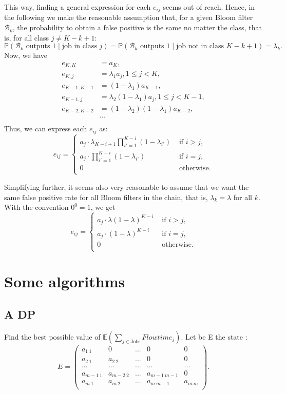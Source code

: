 \documentclass{article}
\begin{document}
This way, finding a general expression for each \(e_{ij}\) seems out of reach.
Hence, in the following we make the reasonable assumption that, for a given Bloom filter \(\mathcal{B}_k\), the probability to obtain a false positive is the same no matter the class, that is, for all class \(j\ne K-k+1\):
\[
    \mathbb{P}(\mathcal{B}_k\text{ outputs 1}\mid\text{job in class }j)=
    \mathbb{P}(\mathcal{B}_k\text{ outputs 1}\mid\text{job not in class }K-k+1)=
    \lambda_k.
\]
Now, we have
\begin{align*}
    e_{K,K}&=a_K, \\
    e_{K,j}&=\lambda_1a_j,1\le j<K, \\
    e_{K-1,K-1}&=(1-\lambda_1)a_{K-1}, \\
    e_{K-1,j}&=\lambda_2(1-\lambda_1)a_j,1\le j<K-1, \\
    e_{K-2,K-2}&=(1-\lambda_2)(1-\lambda_1)a_{K-2}, \\
    &\cdots \\
\end{align*}
Thus, we can express each \(e_{ij}\) as:
\[
    e_{ij}=\begin{cases}
        a_j\cdot\lambda_{K-i+1}\prod_{i'=1}^{K-i} (1-\lambda_{i'}) & \text{ if }i>j, \\
        a_j\cdot\prod_{i'=1}^{K-i} (1-\lambda_{i'}) & \text{ if }i=j, \\
        0 & \text{ otherwise.} \\
    \end{cases}
\]

Simplifying further, it seems also very reasonable to assume that we want the same false positive rate for all Bloom filters in the chain, that is, \(\lambda_k=\lambda\) for all \(k\).
With the convention \(0^0=1\), we get
\[
    e_{ij}=\begin{cases}
        a_j\cdot\lambda(1-\lambda)^{K-i} & \text{ if }i>j, \\
        a_j\cdot(1-\lambda)^{K-i} & \text{ if }i=j, \\
        0 & \text{ otherwise.} \\
    \end{cases}
\]

\newpage
\section{Some algorithms}
\subsection{A DP}\label{DP}
Find the best possible value of $\mathbb{E}(\sum_{j\in\text{Jobs}}Flowtime_j)$. Let be E the state : \[
        E=\begin{pmatrix}
            a_{1\ 1} & 0 & ...& 0 & 0\\
            a_{2\ 1} & a_{2\ 2} & ...& 0 & 0 \\
            ... & ... & ... & ... & ...\\
			a_{m-1\ 1} & a_{m-2\ 2} & ...& a_{m-1\ m-1} & 0 \\	
			a_{m\ 1} & a_{m\ 2} & ... & a_{m\ m-1}& a_{m\ m} \\
        \end{pmatrix}.
    \]
\end{document}
